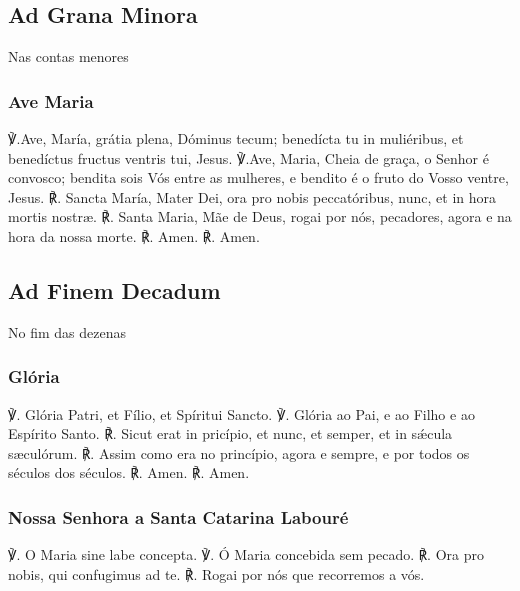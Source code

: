 \subsection{Ad Grana Minora}
\begin{nscenter}Nas contas menores\end{nscenter}
\subsubsection{Ave Maria}
\begin{paracol}{2}
℣.Ave, María, grátia plena, Dóminus tecum; benedícta tu in muliéribus, et benedíctus fructus ventris tui, Jesus.
\switchcolumn
℣.Ave, Maria, Cheia de graça, o Senhor é convosco; bendita sois Vós entre as mulheres, e bendito é o fruto do Vosso ventre, Jesus.
\switchcolumn*
℟. Sancta María, Mater Dei, ora pro nobis peccatóribus, nunc, et in hora mortis nostræ.
\switchcolumn
℟. Santa Maria, Mãe de Deus, rogai por nós, pecadores, agora e na hora da nossa morte.
\switchcolumn*
℟. Amen.
\switchcolumn
℟. Amen.
\end{paracol}

\subsection{Ad Finem Decadum}
\begin{nscenter}No fim das dezenas\end{nscenter}
\subsubsection{Glória}
\begin{paracol}{2}
℣. Glória Patri, et Fílio, et Spíritui Sancto.
\switchcolumn
℣. Glória ao Pai, e ao Filho e ao Espírito Santo.
\switchcolumn*
℟. Sicut erat in pricípio, et nunc, et semper, et in sǽcula sæculórum.
\switchcolumn
℟. Assim como era no princípio, agora e sempre, e por todos os séculos dos
séculos.
\switchcolumn*
℟. Amen.
\switchcolumn
℟. Amen.
\end{paracol}

\subsubsection{Nossa Senhora a Santa Catarina Labouré}
\begin{paracol}{2}
℣. O Maria sine labe concepta.
\switchcolumn
℣. Ó Maria concebida sem pecado.
\switchcolumn*
℟. Ora pro nobis, qui confugimus ad te.
\switchcolumn
℟. Rogai por nós que recorremos a vós.
\end{paracol}

